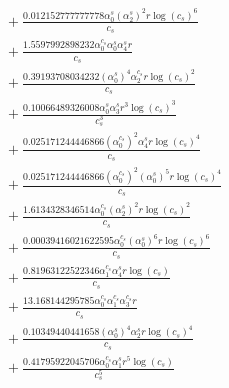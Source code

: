 \documentclass[10pt]{article}
\begin{document}
\begin{align*}
&{}  + \frac{0.012152777777778 \alpha_{0}^s \left(\alpha_{2}^s\right)^{2} r \log{\left(c_{s} \right)}^{6}}{c_{s}} \\
&{}  + \frac{1.5597992898232 \alpha_{0}^{c_s} \alpha_{0}^s \alpha_{4}^s r}{c_{s}} \\
&{}  + \frac{0.39193708034232 \left(\alpha_{0}^s\right)^{4} \alpha_{2}^{c_s} r \log{\left(c_{s} \right)}^{2}}{c_{s}} \\
&{}  + \frac{0.10066489326008 \alpha_{0}^s \alpha_{3}^s r^{3} \log{\left(c_{s} \right)}^{3}}{c_{s}^{3}} \\
&{}  + \frac{0.025171244446866 \left(\alpha_{0}^{c_s}\right)^{2} \alpha_{4}^s r \log{\left(c_{s} \right)}^{4}}{c_{s}} \\
&{}  + \frac{0.025171244446866 \left(\alpha_{0}^{c_s}\right)^{2} \left(\alpha_{0}^s\right)^{5} r \log{\left(c_{s} \right)}^{4}}{c_{s}} \\
&{}  + \frac{1.6134328346514 \alpha_{0}^{c_s} \left(\alpha_{2}^s\right)^{2} r \log{\left(c_{s} \right)}^{2}}{c_{s}} \\
&{}  + \frac{0.00039416021622595 \alpha_{0}^{c_s} \left(\alpha_{0}^s\right)^{6} r \log{\left(c_{s} \right)}^{6}}{c_{s}} \\
&{}  + \frac{0.81963122522346 \alpha_{1}^{c_s} \alpha_{4}^s r \log{\left(c_{s} \right)}}{c_{s}} \\
&{}  + \frac{13.168144295785 \alpha_{0}^{c_s} \alpha_{1}^{c_s} \alpha_{3}^{c_s} r}{c_{s}} \\
&{}  + \frac{0.10349440441658 \left(\alpha_{0}^s\right)^{4} \alpha_{2}^s r \log{\left(c_{s} \right)}^{4}}{c_{s}} \\
&{}  + \frac{0.41795922045706 \alpha_{0}^{c_s} \alpha_{1}^s r^{5} \log{\left(c_{s} \right)}}{c_{s}^{5}}
\end{align*}
\end{document}
